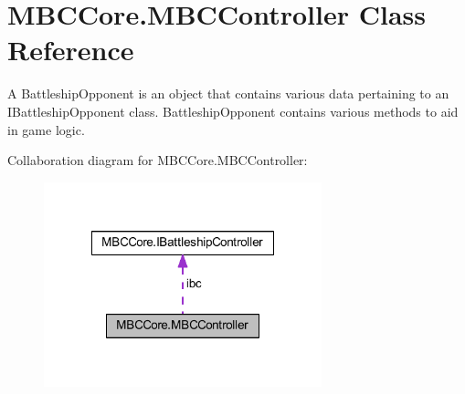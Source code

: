 \hypertarget{class_m_b_c_core_1_1_m_b_c_controller}{\section{M\-B\-C\-Core.\-M\-B\-C\-Controller Class Reference}
\label{class_m_b_c_core_1_1_m_b_c_controller}
}


A Battleship\-Opponent is an object that contains various data pertaining to an I\-Battleship\-Opponent class. Battleship\-Opponent contains various methods to aid in game logic. 




Collaboration diagram for M\-B\-C\-Core.\-M\-B\-C\-Controller\-:\nopagebreak
\begin{figure}[H]
\begin{center}
\leavevmode
\includegraphics[width=228pt]{class_m_b_c_core_1_1_m_b_c_controller__coll__graph}
\end{center}
\end{figure}
